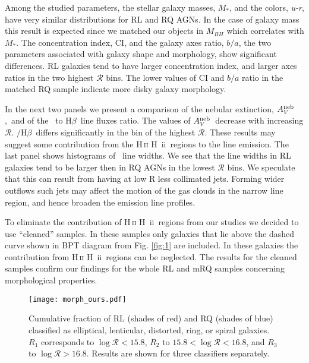 \documentclass[utf8]{frontiersSCNS}
\newcommand{\Avneb}{$A_{V}^{\rm neb}$}
\newcommand{\hii}{\ifmmode \rm{H}\,\textsc{ii} \else H~{\sc ii}\fi}
\newcommand{\Hb}{\ifmmode {\rm H}\beta \else H$\beta$\fi}
\newcommand{\oiii}{\ifmmode [\rm{O}\,\textsc{iii}] \else [O~{\sc iii}]\fi}
\begin{document}
Among the studied parameters, the stellar galaxy masses, $M_{*}$, and the colors, {\it u-r}, have very similar distributions for RL and RQ AGNs. In the case of galaxy mass this result is expected since we matched our objects in $M_{BH}$ which correlates with $M_{*}$. The concentration index, CI, and the galaxy axes ratio, $b/a$, the two parameters associated with galaxy shape and morphology, show significant differences. RL galaxies tend to have larger concentration index, and larger axes ratios in the two highest ${\mathcal R}$ bins. The lower values of CI and $b/a$ ratio in the matched RQ sample indicate more disky galaxy morphology. 

In the next two panels we present a comparison of the nebular extinction, \Avneb,\ and of the \oiii\ to \Hb\ line fluxes ratio. The values of \Avneb\ decrease with increasing ${\mathcal R}$. \oiii$/$\Hb\ differs significantly in the bin of the highest ${\mathcal R}$. These results may suggest some contribution from the \hii\ regions to the line emission. The last panel shows histograms of \oiii\ line widths. We see that the line widths in RL galaxies tend to be larger then in RQ AGNs in the lowest ${\mathcal R}$ bins. We speculate that this can result from having at low R less collimated jets. Forming wider outflows such jets may affect the motion of the gas clouds in the narrow line region, and hence broaden the emission line profiles. 

To eliminate the contribution of \hii\ regions from our studies we decided to use ``cleaned'' samples. In these samples only galaxies that lie above the dashed curve shown in BPT diagram from Fig. \ref{fig:1} are included. In these galaxies the contribution from \hii\ regions can be neglected. The results for the cleaned samples \citep[see][]{KozielWierzbowska.etal.2017a} confirm our findings for the whole RL and mRQ samples concerning morphological properties. 

\begin{figure}[h!]
\begin{center}
\texttt{[image: morph\_ours.pdf]}
\end{center}
\caption{Cumulative fraction of RL (shades of red) and RQ (shades of blue) classified as elliptical, lenticular, distorted, ring, or spiral galaxies. $R_{1}$ corresponds to $\log {\mathcal R} < 15.8 $, $R_{2}$ to $15.8 < \log {\mathcal R} < 16.8$, and $R_{3}$ to $\log {\mathcal R} > 16.8$. Results are shown for three classifiers separately.}\label{fig:3}
\end{figure}
\end{document}
